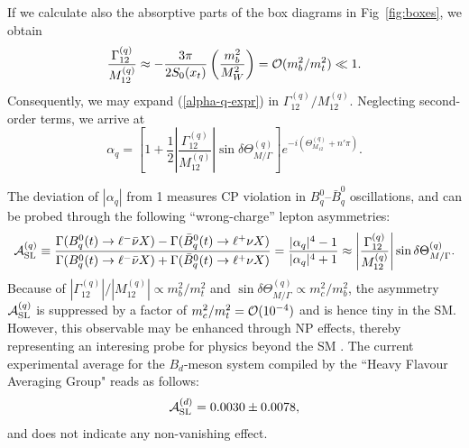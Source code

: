 \documentclass[12pt]{article}
\begin{document}
If we calculate also the absorptive parts of the box diagrams in
Fig~\ref{fig:boxes}, we obtain
\begin{equation}
\frac{\Gamma_{12}^{(q)}}{M_{12}^{(q)}}\approx
-\frac{3\pi}{2S_0(x_{t})}\left(\frac{m_b^2}{M_W^2}\right)
={\cal O}(m_b^2/m_t^2)\ll 1.
\end{equation}
Consequently, we may expand (\ref{alpha-q-expr}) in 
$\Gamma_{12}^{(q)}/M_{12}^{(q)}$. Neglecting second-order 
terms, we arrive at
\begin{equation}
\alpha_q=\left[1+\frac{1}{2}\left|
\frac{\Gamma_{12}^{(q)}}{M_{12}^{(q)}}\right|\sin\delta
\Theta_{M/\Gamma}^{(q)}\right]e^{-i\left(\Theta_{M_{12}}^{(q)}+n'\pi\right)}.
\end{equation}


The deviation of $|\alpha_q|$ from 1 measures CP violation in 
$B^0_q$--$\bar B^0_q$ oscillations, and can be probed through
the following ``wrong-charge'' lepton asymmetries:
\begin{equation}
{\cal A}^{(q)}_{\mbox{{\scriptsize SL}}}\equiv
\frac{\Gamma(B^0_q(t)\to \ell^-\bar\nu X)-\Gamma(\bar B^0_q(t)\to
\ell^+\nu X)}{\Gamma(B^0_q(t)\to \ell^-\bar \nu X)+
\Gamma(\bar B^0_q(t)\to \ell^+\nu X)}
=\frac{|\alpha_q|^4-1}{|\alpha_q|^4+1}\approx\left|
\frac{\Gamma_{12}^{(q)}}{M_{12}^{(q)}}\right|
\sin\delta\Theta^{(q)}_{M/\Gamma}.
\end{equation}
Because of $|\Gamma_{12}^{(q)}|/|M_{12}^{(q)}|\propto
m_b^2/m_t^2$ and $\sin\delta\Theta^{(q)}_{M/\Gamma}\propto m_c^2/m_b^2$,
the asymmetry ${\cal A}^{(q)}_{\mbox{{\scriptsize SL}}}$ is suppressed by 
a factor of $m_c^2/m_t^2={\cal O}(10^{-4})$ and is hence tiny in the SM.
However, this observable may be enhanced through NP effects, thereby
representing an interesing probe for physics beyond the SM 
\cite{LLNP,BBLN-CFLMT}.  The current experimental average for the $B_d$-meson
system compiled by the ``Heavy Flavour Averaging Group" \cite{HFAG} reads
as follows:
\begin{equation}%
{\cal A}^{(d)}_{\mbox{{\scriptsize SL}}}=0.0030\pm0.0078,
\end{equation}
and does not indicate any non-vanishing effect.


%
%
%
\end{document}
